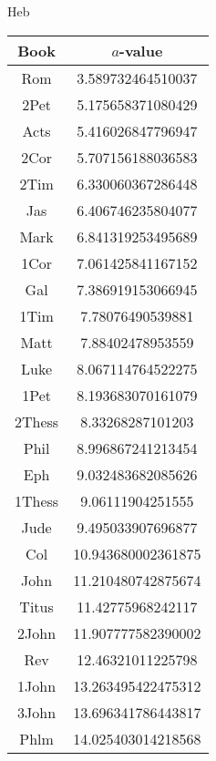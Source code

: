 \documentclass[12pt,letterpaper]{article}
\begin{document}
Heb
\begin{longtable}{|c|c|}
\hline
 Book & $a$-value \\ \hline
Rom & 3.589732464510037 \\ \hline
 2Pet & 5.175658371080429 \\ \hline
 Acts & 5.416026847796947 \\ \hline
 2Cor & 5.707156188036583 \\ \hline
 2Tim & 6.330060367286448 \\ \hline
 Jas & 6.406746235804077 \\ \hline
 Mark & 6.841319253495689 \\ \hline
 1Cor & 7.061425841167152 \\ \hline
 Gal & 7.386919153066945 \\ \hline
 1Tim & 7.78076490539881 \\ \hline
 Matt & 7.88402478953559 \\ \hline
 Luke & 8.067114764522275 \\ \hline
 1Pet & 8.193683070161079 \\ \hline
 2Thess & 8.33268287101203 \\ \hline
 Phil & 8.996867241213454 \\ \hline
 Eph & 9.032483682085626 \\ \hline
 1Thess & 9.06111904251555 \\ \hline
 Jude & 9.495033907696877 \\ \hline
 Col & 10.943680002361875 \\ \hline
 John & 11.210480742875674 \\ \hline
 Titus & 11.42775968242117 \\ \hline
 2John & 11.907777582390002 \\ \hline
 Rev & 12.46321011225798 \\ \hline
 1John & 13.263495422475312 \\ \hline
 3John & 13.696341786443817 \\ \hline
 Phlm & 14.025403014218568 \\ \hline 
\end{longtable}
\end{document}
